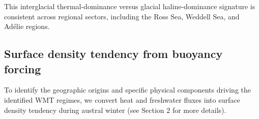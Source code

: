 \documentclass[pdflatex,sn-nature]{sn-jnl}
\begin{document}
This interglacial thermal-dominance versus glacial haline-dominance signature is consistent across regional sectors, including the Ross Sea, Weddell Sea, and Ad\'{e}lie regions.









\subsection{Surface density tendency from buoyancy forcing}

To identify the geographic origins and specific physical components driving the identified WMT regimes, we convert heat and freshwater fluxes into surface density tendency during austral winter (see Section 2 for more details).
\end{document}
